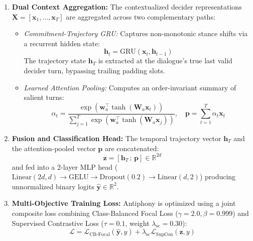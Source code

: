 \begin{enumerate}
\begin{equation}
    \end{equation}
    The cross-attended representations are combined via residual layer normalization:
    \begin{equation}
      \mathbf{X} = \text{LayerNorm}(\widetilde{\mathbf{H}}^{(\mathcal{D})} + \mathbf{C}^{(\mathcal{D} \to \mathcal{P})})
    \end{equation}
  \item \textbf{Dual Context Aggregation:} The contextualized decider representations $\mathbf{X} = [\mathbf{x}_1, \dots, \mathbf{x}_T]$ are aggregated across two complementary paths:
    \begin{itemize}
      \item \textit{Commitment-Trajectory GRU:} Captures non-monotonic stance shifts via a recurrent hidden state:
        \begin{equation}
          \mathbf{h}_t = \text{GRU}(\mathbf{x}_t, \mathbf{h}_{t-1})
        \end{equation}
        The trajectory state $\mathbf{h}_T$ is extracted at the dialogue's true last valid decider turn, bypassing trailing padding slots.
      \item \textit{Learned Attention Pooling:} Computes an order-invariant summary of salient turns:
        \begin{equation}
          \alpha_t = \frac{\exp(\mathbf{w}_a^\top \tanh(\mathbf{W}_a \mathbf{x}_t))}{\sum_{j=1}^{T} \exp(\mathbf{w}_a^\top \tanh(\mathbf{W}_a \mathbf{x}_j))}, \quad \mathbf{p} = \sum_{t=1}^{T} \alpha_t \mathbf{x}_t
        \end{equation}
    \end{itemize}
  \item \textbf{Fusion and Classification Head:} The temporal trajectory vector $\mathbf{h}_T$ and the attention-pooled vector $\mathbf{p}$ are concatenated:
    \begin{equation}
      \mathbf{z} = [\mathbf{h}_T \,;\, \mathbf{p}] \in \mathbb{R}^{2d}
    \end{equation}
    and fed into a 2-layer MLP head ($\text{Linear}(2d, d) \to \text{GELU} \to \text{Dropout}(0.2) \to \text{Linear}(d, 2)$) producing unnormalized binary logits $\hat{\mathbf{y}} \in \mathbb{R}^2$.
  \item \textbf{Multi-Objective Training Loss:} Antiphony is optimized using a joint composite loss combining Class-Balanced Focal Loss \cite{cui2019class} ($\gamma=2.0, \beta=0.999$) and Supervised Contrastive Loss \cite{khosla2020supervised} ($\tau=0.1$, weight $\lambda_{\text{sc}} = 0.30$):
    \begin{equation}
      \mathcal{L} = \mathcal{L}_{\text{CB-Focal}}(\hat{\mathbf{y}}, y) + \lambda_{\text{sc}} \mathcal{L}_{\text{SupCon}}(\mathbf{z}, y)
    \end{equation}
\end{enumerate}

